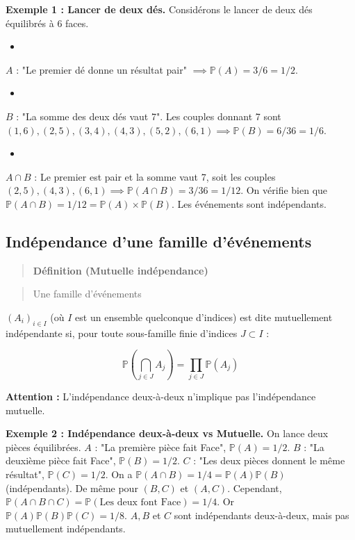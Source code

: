 \documentclass[11pt,a4paper]{article}
\begin{document}
\textbf{Exemple 1 : Lancer de deux dés.}
Considérons le lancer de deux dés équilibrés à 6 faces.
\begin{itemize}
\item
\end{itemize}$A$ : "Le premier dé donne un résultat pair" $\implies \mathbb{P}(A) = 3/6 = 1/2$.
\begin{itemize}
\item
\end{itemize}$B$ : "La somme des deux dés vaut 7".
Les couples donnant 7 sont $(1,6), (2,5), (3,4), (4,3), (5,2), (6,1) \implies \mathbb{P}(B) = 6/36 = 1/6$.
\begin{itemize}
\item
\end{itemize}$A \cap B$ : Le premier est pair et la somme vaut 7, soit les couples $(2,5), (4,3), (6,1) \implies \mathbb{P}(A \cap B) = 3/36 = 1/12$.
On vérifie bien que $\mathbb{P}(A \cap B) = 1/12 = \mathbb{P}(A) \times \mathbb{P}(B)$. Les événements sont indépendants.

\subsection{Indépendance d'une famille d'événements}

\begin{quote}
\textbf{Définition (Mutuelle indépendance)}
\end{quote}
\begin{quote}
Une famille d'événements
\end{quote}$(A_i)_{i \in I}$ (où $I$ est un ensemble quelconque d'indices) est dite mutuellement indépendante si, pour toute sous-famille finie d'indices $J \subset I$ :
\begin{quote}

\end{quote}$$\mathbb{P}\left(\bigcap_{j \in J} A_j\right) = \prod_{j \in J} \mathbb{P}(A_j)$$

\textbf{Attention :} L'indépendance deux-à-deux n'implique pas l'indépendance mutuelle.

\textbf{Exemple 2 : Indépendance deux-à-deux vs Mutuelle.}
On lance deux pièces équilibrées.
$A$ : "La première pièce fait Face", $\mathbb{P}(A) = 1/2$.
$B$ : "La deuxième pièce fait Face", $\mathbb{P}(B) = 1/2$.
$C$ : "Les deux pièces donnent le même résultat", $\mathbb{P}(C) = 1/2$.
On a $\mathbb{P}(A \cap B) = 1/4 = \mathbb{P}(A)\mathbb{P}(B)$ (indépendants). De même pour $(B,C)$ et $(A,C)$.
Cependant, $\mathbb{P}(A \cap B \cap C) = \mathbb{P}(\text{Les deux font Face}) = 1/4$.
Or $\mathbb{P}(A)\mathbb{P}(B)\mathbb{P}(C) = 1/8$.
$A, B$ et $C$ sont indépendants deux-à-deux, mais pas mutuellement indépendants.
\end{document}

